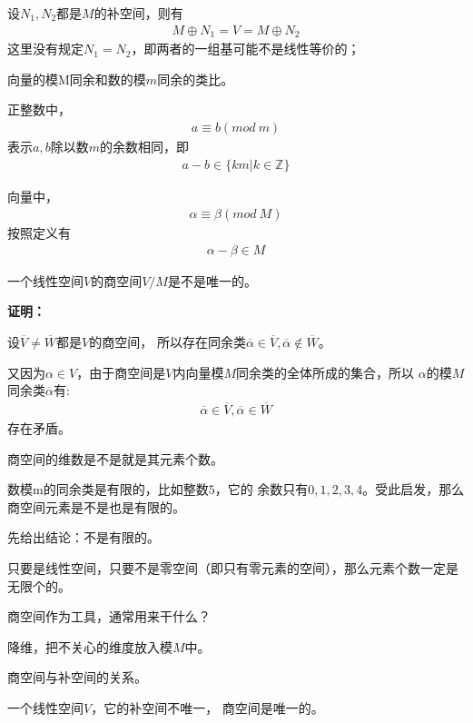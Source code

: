 \documentclass{article}
\begin{document}
设$N_1, N_2$都是$M$的补空间，则有
\begin{align*}
  M \oplus N_1 = V = M \oplus N_2
\end{align*}
这里没有规定$N_1 = N_2$，即两者的一组基可能不是线性等价的；


\begin{zremark}
  向量的模M同余和数的模$m$同余的类比。
\end{zremark}

正整数中，
\begin{align*}
  a \equiv b (mod \ m)
\end{align*}
表示$a,b$除以数$m$的余数相同，即
\begin{align*}
  a - b \in \{km | k \in \mathbb{Z}\}
\end{align*}

向量中，
\begin{align*}
  \alpha \equiv \beta (mod \ M)
\end{align*}
按照定义有
\begin{align*}
  \alpha - \beta \in M
\end{align*}

\begin{zremark}
  一个线性空间$V$的商空间$V/M$是不是唯一的。
\end{zremark}

\textbf{证明：}

设$\overline{V} \neq \overline{W}$都是$V$的商空间，
所以存在同余类$\overline{\alpha} \in \overline{V}, \overline{\alpha} \notin \overline{W}$。

又因为$\alpha \in V$，由于商空间是$V$内向量模$M$同余类的全体所成的集合，所以
$\alpha$的模$M$同余类$\overline{\alpha}$有:
\begin{align*}
  \overline{\alpha} \in \overline{V}, \overline{\alpha} \in \overline{W}
\end{align*}
存在矛盾。

\begin{zremark}
  商空间的维数是不是就是其元素个数。
\end{zremark}

数模m的同余类是有限的，比如整数$5$，它的
余数只有$0, 1, 2, 3, 4$。受此启发，那么商空间元素是不是也是有限的。

先给出结论：不是有限的。

只要是线性空间，只要不是零空间（即只有零元素的空间），那么元素个数一定是无限个的。

\begin{zremark}
  商空间作为工具，通常用来干什么？
\end{zremark}

降维，把不关心的维度放入模$M$中。

\begin{zremark}
  商空间与补空间的关系。
\end{zremark}

一个线性空间$V$，它的补空间不唯一，
商空间是唯一的。
\end{document}
